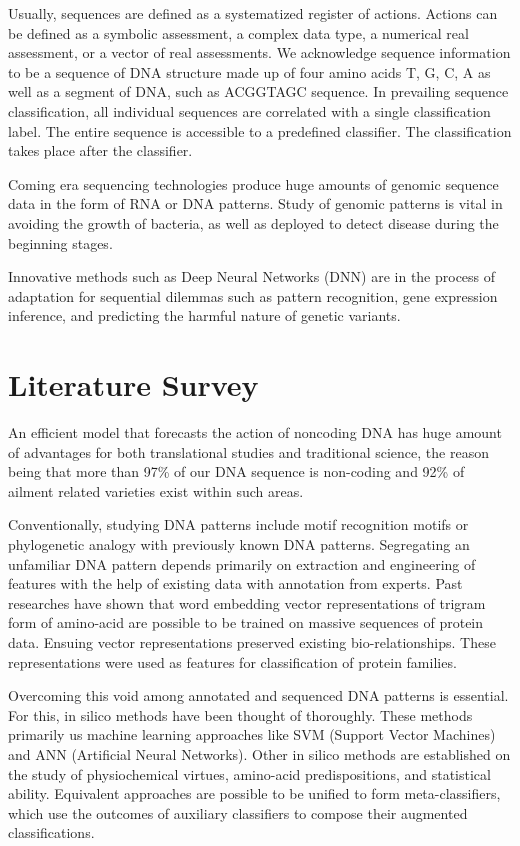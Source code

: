 \documentclass[conference]{IEEEtran}
\begin{document}
Usually, sequences are defined as a systematized register of actions. Actions can be defined as a symbolic assessment, a complex data type, a numerical real assessment,  or a vector of real assessments. We acknowledge sequence information to be a sequence of DNA structure made up of four amino acids T, G, C, A as well as a segment of DNA, such as ACGGTAGC sequence. In prevailing sequence classification, all individual sequences are correlated with a single classification label. The entire sequence is accessible to a predefined classifier. The classification takes place after the classifier.
\newline

Coming era sequencing technologies produce huge amounts of genomic sequence data in the form of RNA or DNA patterns. Study of genomic patterns is vital in avoiding the growth of bacteria, as well as deployed to detect disease during the beginning stages. 

Innovative methods such as Deep Neural Networks (DNN) are in the process of adaptation for sequential dilemmas such as pattern recognition, gene expression inference, and predicting the harmful nature of genetic variants.\cite{danq}

\section{Literature Survey}
An efficient model that forecasts the action of noncoding DNA has huge amount of advantages for both translational studies and traditional science, the reason being that more than 97\% of our DNA sequence is non-coding and 92\% of ailment related varieties exist within such areas.
\newline

Conventionally, studying DNA patterns include motif recognition motifs or phylogenetic analogy with previously known DNA patterns. Segregating an unfamiliar DNA pattern depends primarily on extraction and engineering of features with the help of existing data with annotation from experts. Past researches have shown that word embedding vector representations of trigram form of amino-acid are possible to be trained on massive sequences of protein data.\cite{survey} Ensuing vector representations preserved existing bio-relationships. These representations were used as features for classification of protein families.
\newline

Overcoming this void among annotated and sequenced DNA patterns is essential. For this, in silico methods have been thought of thoroughly. These methods primarily us machine learning approaches like SVM (Support Vector Machines) and ANN  (Artificial Neural Networks).\cite{deeprnn} Other in silico methods are established on the study of physiochemical virtues, amino-acid predispositions, and statistical ability. Equivalent approaches are possible to be unified to form meta-classifiers, which use the outcomes of auxiliary classifiers to compose their augmented classifications.
\newline
\end{document}
